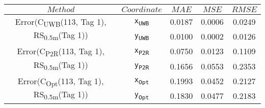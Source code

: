 \begin{table}[h]
\centering
\begin{tabular}{|c|c|c|c|c|}
\hline
$Method$ & $Coordinate$ & $MAE$ & $MSE$ & $RMSE$ \\
\hline
\multirow{2}{*}{{\footnotesize Error(C\textsubscript{UWB}(113, Tag 1), RS\textsubscript{0.5m}(Tag 1))}} & \texttt{x\textsubscript{UWB}} & 0.0187 & 0.0006 & 0.0249 \\
& \texttt{y\textsubscript{UWB}} & 0.0100 & 0.0002 & 0.0126 \\
\hline
\multirow{2}{*}{{\footnotesize Error(C\textsubscript{P2R}(113, Tag 1), RS\textsubscript{0.5m}(Tag 1))}} & \texttt{x\textsubscript{P2R}} & 0.0750 & 0.0123 & 0.1109 \\
& \texttt{y\textsubscript{P2R}} & 0.1656 & 0.0553 & 0.2353 \\
\hline
\multirow{2}{*}{{\footnotesize Error(C\textsubscript{Opt}(113, Tag 1), RS\textsubscript{0.5m}(Tag 1))}} & \texttt{x\textsubscript{Opt}} & 0.1993 & 0.0452 & 0.2127 \\
& \texttt{y\textsubscript{Opt}} & 0.1830 & 0.0477 & 0.2183 \\
\hline
\end{tabular}
\end{table}
